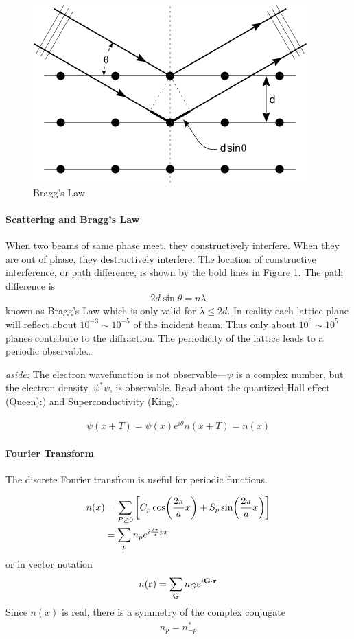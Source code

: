 \documentclass[../main.tex]{subfiles}
\begin{document}
\begin{figure}[ht]
    \centering
    \includegraphics[width=0.4\linewidth]{bragg.png}
    \caption{Bragg's Law}
    \label{fig:2.1}
\end{figure}

\paragraph{Scattering and Bragg's Law}

When two beams of same phase meet, they constructively interfere. When they are out of phase, they
destructively interfere. The location of constructive interference, or path difference, is shown
by the bold lines in Figure \ref{fig:2.1}. The path difference is
\begin{align*}
    2d \sin \theta = n \lambda
\end{align*}
known as Bragg's Law which is only valid for $\lambda \leq 2d$. In reality each lattice plane will
reflect about $10^{-3} \sim 10^{-5}$ of the incident beam. Thus only about $10^3 \sim 10^5$ planes
contribute to the diffraction. The periodicity of the lattice leads to a periodic observable\dots

\emph{aside:} The electron wavefunction is not observable---$\psi$ is a complex number, but the
electron density, $\psi^* \psi$, is observable. Read about the quantized Hall effect (Queen):) and
Superconductivity (King).

\begin{align*}
    \psi(x + T) = \psi(x) e^{i\theta}
    n(x + T) = n(x)
\end{align*}

\paragraph{Fourier Transform} The discrete Fourier transfrom is useful for periodic functions.

\begin{align*}
    n(x) &= \sum_{P \geq 0} \qt[C_p \cos(\frac{2\pi}{a}x) + S_p \sin(\frac{2\pi}{a}x)] \\
    &= \sum_{p} n_p e^{i\frac{2\pi}{a}px}
\end{align*}
or in vector notation
\begin{align*}
    n(\vb{r}) = \sum_{\vb{G}} n_G e^{i\vb{G} \vdot \vb{r}}
\end{align*}
Since $n(x)$ is real, there is a symmetry of the complex conjugate
\begin{align*}
    n_p = n_{-p}^*
\end{align*}
\end{document}
